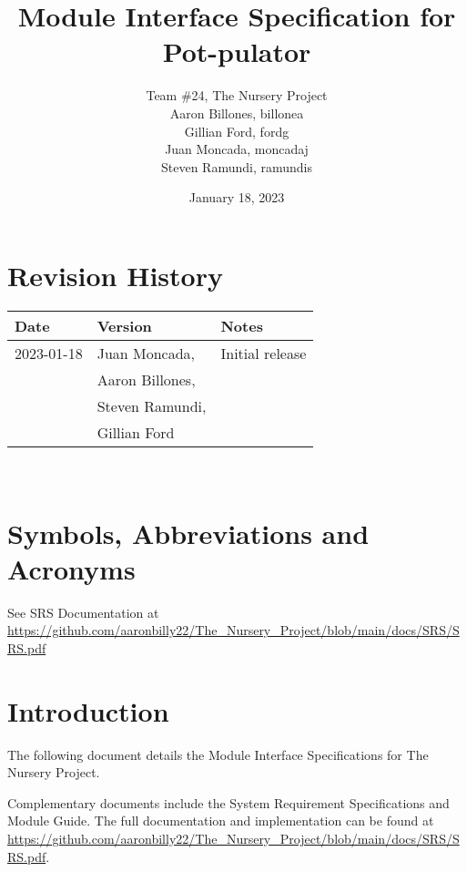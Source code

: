\documentclass[12pt, titlepage]{article}
\begin{document}
\title{Module Interface Specification for Pot-pulator}

\author{Team \#24, The Nursery Project\\Aaron Billones, billonea\\Gillian Ford, fordg\\Juan Moncada, moncadaj\\Steven Ramundi, ramundis}
\date{January 18, 2023}

\maketitle


\section{Revision History}

\begin{tabularx}{\textwidth}{p{3cm}p{4cm}X}
  \toprule {\bf Date} & {\bf Version} & {\bf Notes}\\
  \midrule
  2023-01-18 & Juan Moncada,& Initial release\\&Aaron Billones,\\&Steven Ramundi,\\&Gillian Ford \\
  
  \bottomrule
  \end{tabularx}

~\newpage

\section{Symbols, Abbreviations and Acronyms}

See SRS Documentation at \url{https://github.com/aaronbilly22/The_Nursery_Project/blob/main/docs/SRS/SRS.pdf}


\newpage

\tableofcontents

\newpage


\section{Introduction}

The following document details the Module Interface Specifications for
The Nursery Project.

\noindent Complementary documents include the System Requirement Specifications
and Module Guide.  The full documentation and implementation can be
found at \url{https://github.com/aaronbilly22/The_Nursery_Project/blob/main/docs/SRS/SRS.pdf}. 
\end{document}
